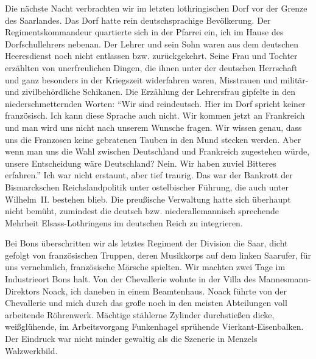 Die nächste Nacht verbrachten wir im letzten lothringischen Dorf vor der Grenze des Saarlandes. Das Dorf hatte rein deutschsprachige Bevölkerung. Der Regimentskommandeur quartierte sich in der Pfarrei ein, ich im Hause des Dorfschullehrers nebenan. Der Lehrer und sein Sohn waren aus dem deutschen Heeresdienst noch nicht entlassen bzw. zurückgekehrt. Seine Frau und Tochter erzählten von unerfreulichen Dingen, die ihnen unter der deutschen Herrschaft und ganz besonders in der Kriegszeit widerfahren waren, Misstrauen und militär- und zivilbehördliche Schikanen. Die Erzählung der Lehrersfrau gipfelte in den niederschmetternden Worten: \enquote{Wir sind rein\linebreak deutsch. Hier im Dorf spricht keiner französisch. Ich kann diese Sprache auch nicht. Wir kommen jetzt an Frankreich und man wird uns nicht nach unserem Wunsche fragen. Wir wissen genau, dass uns die Franzosen keine gebratenen Tauben in den Mund stecken werden. Aber wenn man uns die Wahl zwischen Deutschland und Frankreich zugestehen würde, unsere Entscheidung wäre Deutschland? Nein. Wir haben zuviel Bitteres erfahren.} Ich war nicht erstaunt, aber tief traurig. Das war der Bankrott der Bismarckschen Reichslandpolitik unter ostelbischer Führung, die auch unter Wilhelm~II. bestehen blieb. Die preußische Verwaltung hatte sich überhaupt nicht bemüht, zumindest die deutsch bzw. niederallemannisch sprechende Mehrheit Elsass-Lothringens im deutschen Reich zu integrieren.

Bei Bons überschritten wir als letztes Regiment der Division die Saar, dicht gefolgt von französischen Truppen, deren Musikkorps auf dem linken Saar\-ufer, für uns vernehmlich, französische Märsche spielten. Wir machten zwei Tage im Industrieort Bons halt. Von der Chevallerie wohnte in der Villa des Mannesmann-Direktors Noack, ich daneben in einem Beamtenhaus. Noack führte von der Chevallerie und mich durch das große noch in den meisten Abteilungen voll arbeitende Röhrenwerk. Mächtige stählerne Zylinder durchstießen dicke, weißglühende, im Arbeitsvorgang Funkenhagel sprühende Vierkant-Eisenbalken. Der Eindruck war nicht minder gewaltig als die Szenerie in Menzels Walzwerkbild.

